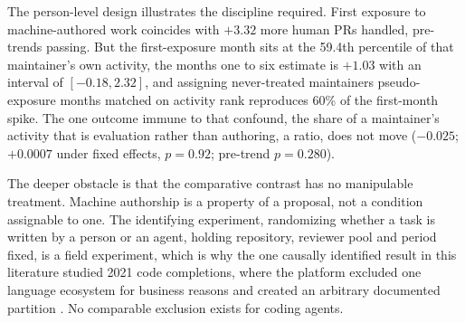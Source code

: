\documentclass[mnsc]{informs4}
\begin{document}
The person-level design illustrates the discipline required. First exposure to
machine-authored work coincides with $+3.32$ more human PRs handled, pre-trends
passing. But the first-exposure month sits at the 59.4th percentile of that
maintainer's own activity, the months one to six estimate is $+1.03$ with an
interval of $[-0.18,2.32]$, and assigning never-treated maintainers pseudo-exposure
months matched on activity rank reproduces 60\% of the first-month spike. The one
outcome immune to that confound, the share of a maintainer's activity that is
evaluation rather than authoring, a ratio, does not move ($-0.025$; $+0.0007$
under fixed effects, $p=0.92$; pre-trend $p=0.280$).

The deeper obstacle is that the comparative contrast has no manipulable treatment. Machine authorship is a property of a proposal, not a condition assignable to one. The identifying experiment, randomizing whether a task is written by a person or
an agent, holding repository, reviewer pool and period fixed, is a field
experiment, which is why the one causally identified result in this literature
studied 2021 code completions, where the platform excluded one language ecosystem
for business reasons and created an arbitrary documented partition
\citep{yeverechyahu2024impact}. No comparable exclusion exists for coding agents.
\end{document}
